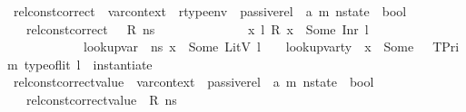 \begin{isabellebody}
\begin{isamarkuptext}
\end{isamarkuptext}\isamarkuptrue%
\isamarkupfalse%
\ rel{\isacharunderscore}{\kern0pt}const{\isacharunderscore}{\kern0pt}correct\ {\isacharcolon}{\kern0pt}{\isacharcolon}{\kern0pt}\ {\isachardoublequoteopen}var{\isacharunderscore}{\kern0pt}context\ {\isasymRightarrow}\ rtype{\isacharunderscore}{\kern0pt}env\ {\isasymRightarrow}\ passive{\isacharunderscore}{\kern0pt}rel\ {\isasymRightarrow}\ {\isacharparenleft}{\kern0pt}{\isacharprime}{\kern0pt}a{\isacharcomma}{\kern0pt}\ {\isacharprime}{\kern0pt}m{\isacharparenright}{\kern0pt}\ nstate\ {\isasymRightarrow}\ bool{\isachardoublequoteclose}\isanewline
\ \ \ {\isachardoublequoteopen}rel{\isacharunderscore}{\kern0pt}const{\isacharunderscore}{\kern0pt}correct\ {\isasymLambda}\ {\isasymOmega}\ R\ ns\ {\isacharequal}{\kern0pt}\ \isanewline
\ \ \ \ \ \ \ \ \ \ \ {\isacharparenleft}{\kern0pt}{\isasymforall}\ x\ l{\isachardot}{\kern0pt}\ R\ x\ {\isacharequal}{\kern0pt}\ Some\ {\isacharparenleft}{\kern0pt}Inr\ l{\isacharparenright}{\kern0pt}\ {\isasymlongrightarrow}\isanewline
\ \ \ \ \ \ \ \ \ \ \ \ {\isacharparenleft}{\kern0pt}lookup{\isacharunderscore}{\kern0pt}var\ {\isasymLambda}\ ns\ x\ {\isacharequal}{\kern0pt}\ Some\ {\isacharparenleft}{\kern0pt}LitV\ l{\isacharparenright}{\kern0pt}\ {\isasymand}\ {\isacharparenleft}{\kern0pt}{\isasymexists}\ {\isasymtau}{\isachardot}{\kern0pt}\ lookup{\isacharunderscore}{\kern0pt}var{\isacharunderscore}{\kern0pt}ty\ {\isasymLambda}\ x\ {\isacharequal}{\kern0pt}\ Some\ {\isasymtau}\ {\isasymand}\ {\isacharparenleft}{\kern0pt}TPrim\ {\isacharparenleft}{\kern0pt}type{\isacharunderscore}{\kern0pt}of{\isacharunderscore}{\kern0pt}lit\ l{\isacharparenright}{\kern0pt}{\isacharparenright}{\kern0pt}\ {\isacharequal}{\kern0pt}\ instantiate\ {\isasymOmega}\ {\isasymtau}{\isacharparenright}{\kern0pt}{\isacharparenright}{\kern0pt}{\isacharparenright}{\kern0pt}{\isachardoublequoteclose}\isanewline
\isanewline
{}\isamarkupfalse%
\ rel{\isacharunderscore}{\kern0pt}const{\isacharunderscore}{\kern0pt}correct{\isacharunderscore}{\kern0pt}value\ {\isacharcolon}{\kern0pt}{\isacharcolon}{\kern0pt}\ {\isachardoublequoteopen}var{\isacharunderscore}{\kern0pt}context\ {\isasymRightarrow}\ passive{\isacharunderscore}{\kern0pt}rel\ {\isasymRightarrow}\ {\isacharparenleft}{\kern0pt}{\isacharprime}{\kern0pt}a{\isacharcomma}{\kern0pt}\ {\isacharprime}{\kern0pt}m{\isacharparenright}{\kern0pt}\ nstate\ {\isasymRightarrow}\ bool{\isachardoublequoteclose}\isanewline
\ \ \ {\isachardoublequoteopen}rel{\isacharunderscore}{\kern0pt}const{\isacharunderscore}{\kern0pt}correct{\isacharunderscore}{\kern0pt}value\ {\isasymLambda}\ R\ ns\ {\isacharequal}{\kern0pt}\ \isanewline

\end{isabellebody}

